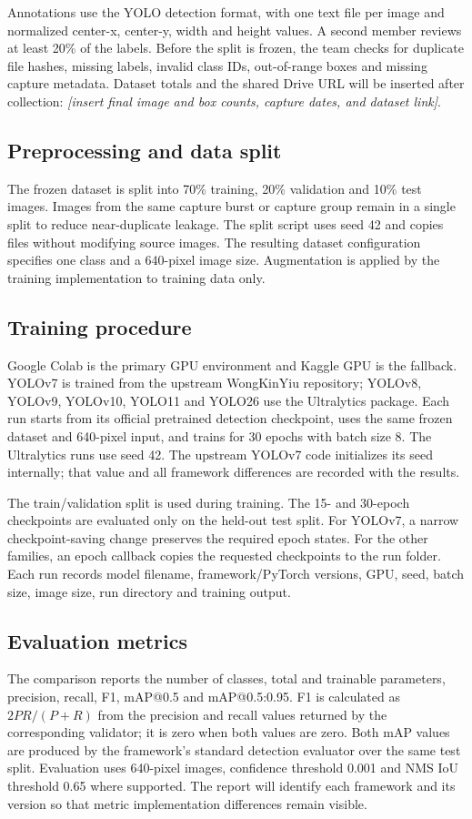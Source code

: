 \documentclass[conference]{IEEEtran}
\begin{document}
Annotations use the YOLO detection format, with one text file per image and normalized center-x, center-y, width and height values. A second member reviews at least 20\% of the labels. Before the split is frozen, the team checks for duplicate file hashes, missing labels, invalid class IDs, out-of-range boxes and missing capture metadata. Dataset totals and the shared Drive URL will be inserted after collection: \emph{[insert final image and box counts, capture dates, and dataset link]}.

\subsection{Preprocessing and data split}
The frozen dataset is split into 70\% training, 20\% validation and 10\% test images. Images from the same capture burst or capture group remain in a single split to reduce near-duplicate leakage. The split script uses seed 42 and copies files without modifying source images. The resulting dataset configuration specifies one class and a 640-pixel image size. Augmentation is applied by the training implementation to training data only.

\subsection{Training procedure}
Google Colab is the primary GPU environment and Kaggle GPU is the fallback. YOLOv7 is trained from the upstream WongKinYiu repository; YOLOv8, YOLOv9, YOLOv10, YOLO11 and YOLO26 use the Ultralytics package. Each run starts from its official pretrained detection checkpoint, uses the same frozen dataset and 640-pixel input, and trains for 30 epochs with batch size 8. The Ultralytics runs use seed 42. The upstream YOLOv7 code initializes its seed internally; that value and all framework differences are recorded with the results.

The train/validation split is used during training. The 15- and 30-epoch checkpoints are evaluated only on the held-out test split. For YOLOv7, a narrow checkpoint-saving change preserves the required epoch states. For the other families, an epoch callback copies the requested checkpoints to the run folder. Each run records model filename, framework/PyTorch versions, GPU, seed, batch size, image size, run directory and training output.

\subsection{Evaluation metrics}
The comparison reports the number of classes, total and trainable parameters, precision, recall, F1, mAP@0.5 and mAP@0.5:0.95. F1 is calculated as \(2PR/(P+R)\) from the precision and recall values returned by the corresponding validator; it is zero when both values are zero. Both mAP values are produced by the framework's standard detection evaluator over the same test split. Evaluation uses 640-pixel images, confidence threshold 0.001 and NMS IoU threshold 0.65 where supported. The report will identify each framework and its version so that metric implementation differences remain visible.
\end{document}
